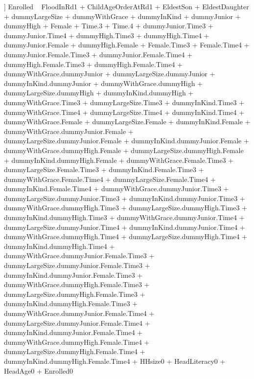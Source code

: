 \begin{Schunk}
\begin{Soutput}
[[6]]
Enrolled ~ FloodInRd1 + ChildAgeOrderAtRd1 + EldestSon + EldestDaughter + 
    dummyLargeSize + dummyWithGrace + dummyInKind + dummyJunior + 
    dummyHigh + Female + Time.3 + Time.4 + dummyJunior.Time3 + 
    dummyJunior.Time4 + dummyHigh.Time3 + dummyHigh.Time4 + dummyJunior.Female + 
    dummyHigh.Female + Female.Time3 + Female.Time4 + dummyJunior.Female.Time3 + 
    dummyJunior.Female.Time4 + dummyHigh.Female.Time3 + dummyHigh.Female.Time4 + 
    dummyWithGrace.dummyJunior + dummyLargeSize.dummyJunior + 
    dummyInKind.dummyJunior + dummyWithGrace.dummyHigh + dummyLargeSize.dummyHigh + 
    dummyInKind.dummyHigh + dummyWithGrace.Time3 + dummyLargeSize.Time3 + 
    dummyInKind.Time3 + dummyWithGrace.Time4 + dummyLargeSize.Time4 + 
    dummyInKind.Time4 + dummyWithGrace.Female + dummyLargeSize.Female + 
    dummyInKind.Female + dummyWithGrace.dummyJunior.Female + 
    dummyLargeSize.dummyJunior.Female + dummyInKind.dummyJunior.Female + 
    dummyWithGrace.dummyHigh.Female + dummyLargeSize.dummyHigh.Female + 
    dummyInKind.dummyHigh.Female + dummyWithGrace.Female.Time3 + 
    dummyLargeSize.Female.Time3 + dummyInKind.Female.Time3 + 
    dummyWithGrace.Female.Time4 + dummyLargeSize.Female.Time4 + 
    dummyInKind.Female.Time4 + dummyWithGrace.dummyJunior.Time3 + 
    dummyLargeSize.dummyJunior.Time3 + dummyInKind.dummyJunior.Time3 + 
    dummyWithGrace.dummyHigh.Time3 + dummyLargeSize.dummyHigh.Time3 + 
    dummyInKind.dummyHigh.Time3 + dummyWithGrace.dummyJunior.Time4 + 
    dummyLargeSize.dummyJunior.Time4 + dummyInKind.dummyJunior.Time4 + 
    dummyWithGrace.dummyHigh.Time4 + dummyLargeSize.dummyHigh.Time4 + 
    dummyInKind.dummyHigh.Time4 + dummyWithGrace.dummyJunior.Female.Time3 + 
    dummyLargeSize.dummyJunior.Female.Time3 + dummyInKind.dummyJunior.Female.Time3 + 
    dummyWithGrace.dummyHigh.Female.Time3 + dummyLargeSize.dummyHigh.Female.Time3 + 
    dummyInKind.dummyHigh.Female.Time3 + dummyWithGrace.dummyJunior.Female.Time4 + 
    dummyLargeSize.dummyJunior.Female.Time4 + dummyInKind.dummyJunior.Female.Time4 + 
    dummyWithGrace.dummyHigh.Female.Time4 + dummyLargeSize.dummyHigh.Female.Time4 + 
    dummyInKind.dummyHigh.Female.Time4 + HHsize0 + HeadLiteracy0 + 
    HeadAge0 + Enrolled0
\end{Soutput}
\end{Schunk}



